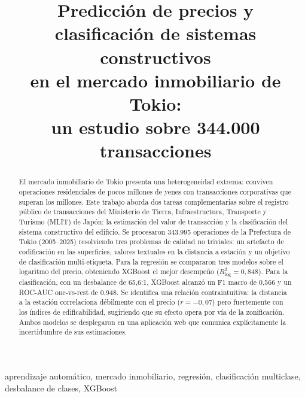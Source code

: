 \documentclass[conference]{IEEEtran}
\begin{document}
\title{Predicción de precios y clasificación de sistemas constructivos\\
en el mercado inmobiliario de Tokio:\\
un estudio sobre 344.000 transacciones}

\author{
}

\maketitle

\begin{abstract}
El mercado inmobiliario de Tokio presenta una heterogeneidad extrema: conviven operaciones
residenciales de pocos millones de yenes con transacciones corporativas que superan los
 millones. Este trabajo aborda dos tareas complementarias sobre el registro
público de transacciones del Ministerio de Tierra, Infraestructura, Transporte y Turismo
(MLIT) de Japón: la estimación del valor de transacción y la clasificación del sistema
constructivo del edificio. Se procesaron 343.995 operaciones de la Prefectura de Tokio
(2005--2025) resolviendo tres problemas de calidad no triviales: un artefacto de codificación
en las superficies, valores textuales en la distancia a estación y un objetivo de
clasificación multi-etiqueta. Para la regresión se compararon tres modelos sobre el logaritmo
del precio, obteniendo XGBoost el mejor desempeño ($R^2_{\log}=0{,}848$). Para la
clasificación, con un desbalance de 65,6:1, XGBoost alcanzó un F1 macro de 0,566 y un ROC-AUC
one-vs-rest de 0,948. Se identifica una relación contraintuitiva: la distancia a la estación
correlaciona débilmente con el precio ($r=-0{,}07$) pero fuertemente con los índices de
edificabilidad, sugiriendo que su efecto opera por vía de la zonificación. Ambos modelos se
desplegaron en una aplicación web que comunica explícitamente la incertidumbre de sus
estimaciones.
\end{abstract}

\begin{IEEEkeywords}
aprendizaje automático, mercado inmobiliario, regresión, clasificación multiclase, desbalance
de clases, XGBoost
\end{IEEEkeywords}
\end{document}
